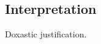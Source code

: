 \subsection{Interpretation}
\label{cha:zSpA:sec:interpretation}

\begin{note}


  Doxastic justification.
\end{note}






